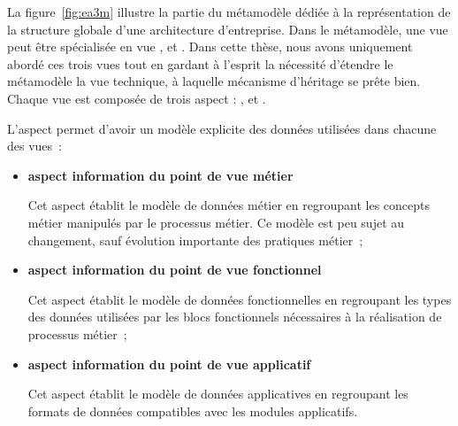     La figure~\ref{fig:ea3m} illustre la partie du métamodèle dédiée à la représentation de la structure globale d'une architecture
    d'entreprise. Dans le métamodèle, une vue peut être spécialisée en vue ,  et . 
    Dans cette thèse, nous avons
    uniquement abordé ces trois vues tout en gardant à l'esprit la nécessité d'étendre le métamodèle la vue technique, à laquelle mécanisme
    d'héritage se prête bien. Chaque vue est composée de trois aspect : ,  et . 

L'aspect  permet d'avoir un
modèle explicite des données utilisées dans chacune des vues~:

\begin{itemize} 

\item \textbf{aspect information du point de vue métier}

Cet aspect établit le modèle de données métier en regroupant les
concepts métier manipulés par le processus métier. Ce modèle est peu sujet au
changement, sauf évolution importante des pratiques métier~;

\item \textbf{aspect information du point de vue fonctionnel}

Cet aspect établit le modèle de données fonctionnelles en regroupant les types des
données utilisées par les blocs fonctionnels nécessaires à la réalisation de
processus métier~;

\item \textbf{aspect information du point de vue applicatif}

Cet aspect établit le modèle de données applicatives en regroupant les formats de données
compatibles avec les modules applicatifs.

\end{itemize}


